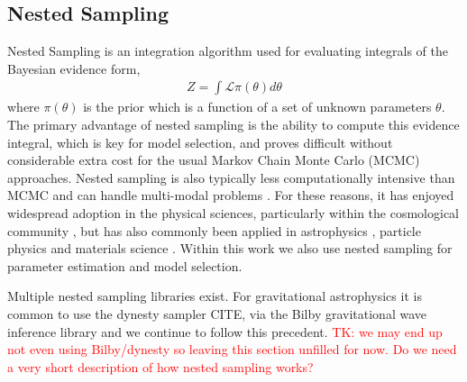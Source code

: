 \documentclass[fleqn,usenatbib,useAMS]{mnras}
\begin{document}
\subsection{Nested Sampling}\label{sec:nested_sampling}
Nested Sampling \citep{Skilling} is an integration algorithm used for evaluating integrals of the Bayesian evidence form,
\begin{eqnarray}
	Z = \int \mathcal{L} \pi (\theta) d \theta
\end{eqnarray}
where $\pi (\theta)$ is the prior which is a function of a set of unknown parameters $\theta$. The primary advantage of nested sampling is the ability to compute this evidence integral, which is key for model selection, and proves difficult without considerable extra cost for the usual Markov Chain Monte Carlo (MCMC) approaches. Nested sampling is also typically less computationally intensive than MCMC and can handle multi-modal problems \citep{Ashton2022}. For these reasons, it has enjoyed widespread adoption in the physical sciences, particularly within the cosmological community \citep{Mukherjee2006,Feroz2008,Handley2015}, but has also commonly been applied in astrophysics \citep{UltraNest2021}, particle physics \citep{proceedings2019033014} and materials science \citep{2009arXiv0906materials}. Within this work we also use nested sampling for parameter estimation and model selection. \newline 


\noindent Multiple nested sampling libraries exist. For gravitational astrophysics it is common to use the dynesty sampler CITE, via the Bilby gravitational wave inference library and we continue to follow this precedent. 
\textcolor{red}{TK: we may end up not even using Bilby/dynesty so leaving this section unfilled for now. Do we need a very short description of how nested sampling works?}
\end{document}
